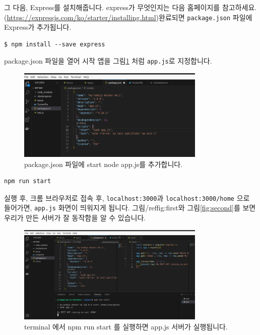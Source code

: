 \documentclass{article}
\begin{document}
그 다음, Express를 설치해줍니다. express가 무엇인지는 다음 홈페이지를 참고하세요. (\url{https://expressjs.com/ko/starter/installing.html})완료되면 \texttt{package.json} 파일에 Express가 추가됩니다. 

\begin{lstlisting}[language=Shell, caption={Express 설치}]
$ npm install --save express
\end{lstlisting}


package.json 파일을 열어 시작 앱을 그림\ref{fig:nodepackage} 처럼 \texttt{app.js}로 지정합니다. 

\begin{figure}[hbt]
  \centering
  \includegraphics[width=0.8\textwidth]{images/nodeapp.png}
  \caption{package.json 파일에 start node app.js를 추가합니다. }
  \label{fig:nodepackage}
\end{figure}

\begin{lstlisting}[language=Shell, caption={Node.js 서버 시작}]
npm run start
\end{lstlisting}

실행 후, 크롬 브라우저로 접속 후, \texttt{localhost:3000}과 \texttt{localhost:3000/home} 으로 들어가면, \texttt{app.js} 화면이 띄워지게 됩니다. 그림/ref{fig:first}와 그림\ref{fig:second}를 보면 우리가 만든 서버가 잘 동작함을 알 수 있습니다. 

\begin{figure}[hbt]
  \centering
  \includegraphics[width=0.8\textwidth]{images/npmrunstart.png}
  \caption{terminal 에서 npm run start 를 실행하면 app.js 서버가 실행됩니다.  }
  \label{fig:npmrunstart}
\end{figure}
\end{document}
